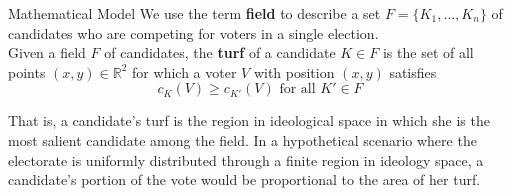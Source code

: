 \documentclass{article}
\newcommand{\noi}{\noindent}
\begin{document}
\begin{section}{Mathematical Model}
\noi We use the term \textbf{field} to describe a set $F = \{K_1, \ldots, K_n\}$ of candidates who are competing for voters in a single election. \\

\noi Given a field $F$ of candidates, the \textbf{turf} of a candidate $K \in F$ is the set of all points $(x,y) \in \mathbb{R}^2$ for which a voter $V$ with position $(x,y)$ satisfies $$c_K(V) \ge c_{K'}(V) \text{ for all } K' \in F$$

\noi That is, a candidate's turf is the region in ideological space in which she is the most salient candidate among the field. In a hypothetical scenario where the electorate is uniformly distributed through a finite region in ideology space, a candidate's portion of the vote would be proportional to the area of her turf.

\end{section}
\end{document}
